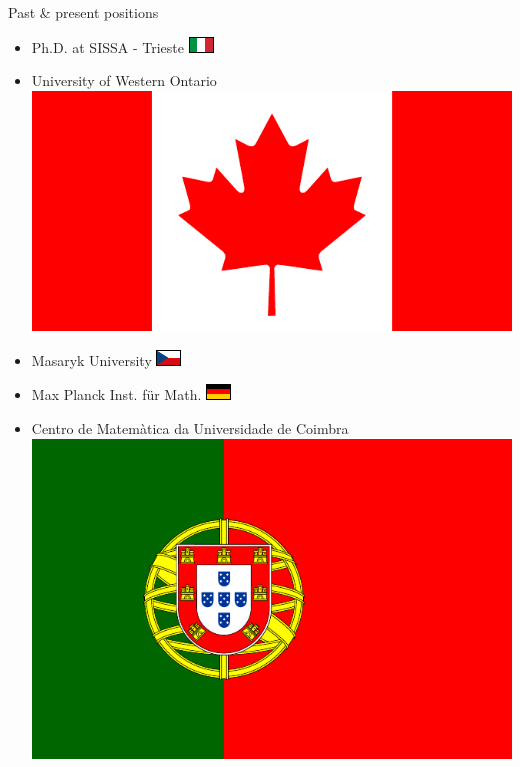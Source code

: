 \documentclass{beamer}
\author{Fosco Loregian \darkLogo}
\title{}
\date{\today}
\begin{document}
\begin{frame}
  \maketitle
\end{frame}
\begin{frame}{Past \& present positions}
  \begin{itemize}
    \item<+-> Ph.D. at SISSA - Trieste \includegraphics{ita.pdf}

    \item<+-> University of Western Ontario \includegraphics[scale=.04]{can.pdf}

    \item<+-> Masaryk University \includegraphics{czr.pdf}

    \item<+-> Max Planck Inst. für Math. \includegraphics{ger.pdf}

    \item<+-> Centro de Matemàtica da Universidade de Coimbra \includegraphics[scale=.04]{por.pdf}


\end{itemize}
\end{frame}
\end{document}
